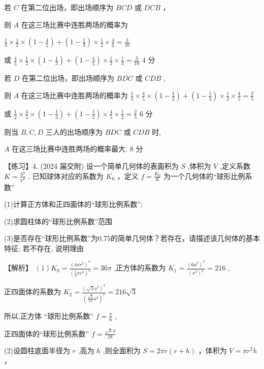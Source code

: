 \documentclass[10pt]{article}
\begin{document}
若 \(C\) 在第二位出场，即出场顺序为 \({BCD}\) 或 \({DCB}\) ，

则 \(A\) 在这三场比赛中连胜两场的概率为

\(\frac{1}{3} \times  \frac{1}{2} \times  \left( {1 - \frac{4}{5}}\right)  + \left( {1 - \frac{1}{3}}\right)  \times  \frac{1}{2} \times  \frac{4}{5} = \frac{3}{10}\)

或 \(\frac{4}{5} \times  \frac{1}{2} \times  \left( {1 - \frac{1}{3}}\right)  + \left( {1 - \frac{4}{5}}\right)  \times  \frac{1}{2} \times  \frac{1}{3} = \frac{3}{10}\) 4 分

若 \(D\) 在第二位出场，即出场顺序为 \({BDC}\) 或 \({CDB}\) ,

则 \(A\) 在这三场比赛中连胜两场的概率为 \(\frac{1}{3} \times  \frac{4}{5} \times  \left( {1 - \frac{1}{2}}\right)  + \left( {1 - \frac{1}{3}}\right)  \times  \frac{1}{2} \times  \frac{4}{5} = \frac{2}{5}\)

或 \(\frac{1}{2} \times  \frac{4}{5} \times  \left( {1 - \frac{1}{3}}\right)  + \left( {1 - \frac{1}{2}}\right)  \times  \frac{4}{5} \times  \frac{1}{2} = \frac{2}{5}\) 6 分

则当 \(B,C,D\) 三人的出场顺序为 \({BDC}\) 或 \({CDB}\) 时,

\(A\) 在这三场比赛中连胜两场的概率最大. 8 分

【练习】4. (2024 届交附) 设一个简单几何体的表面积为 \(S\) ,体积为 \(V\) ,定义系数 \(K = \frac{{S}^{3}}{{V}^{2}}\) . 已知球体对应的系数为 \({K}_{0}\) ，定义 \(f = \frac{{K}_{0}}{K}\) 为一个几何体的“球形比例系数”

(1)计算正方体和正四面体的“球形比例系数”;

(2)求圆柱体的“球形比例系数”范围

(3)是否存在“球形比例系数”为0.75的简单几何体？若存在，请描述该几何体的基本特征; 若不存在, 说明理由

【解析】 \(\left( 1\right) {K}_{0} = \frac{{\left( 4\pi {r}^{2}\right) }^{3}}{{\left( \frac{4}{3}\pi {r}^{3}\right) }^{2}} = {36\pi }\) ,正方体的系数为 \({K}_{1} = \frac{{\left( 6{a}^{2}\right) }^{3}}{{\left( {a}^{3}\right) }^{2}} = {216}\) ,

正四面体的系数为 \({K}_{2} = \frac{{\left( \sqrt{3}{a}^{2}\right) }^{3}}{{\left( \frac{\sqrt{2}}{12}{a}^{3}\right) }^{2}} = {216}\sqrt{3}\)

所以,正方体 “球形比例系数” \(f = \frac{\pi }{6}\) ,

正四面体的“球形比例系数” \(f = \frac{\sqrt{3}\pi }{18}\)

(2)设圆柱底面半径为 \(r\) ,高为 \(h\) ,则全面积为 \(S = {2\pi r}\left( {r + h}\right)\) ，体积为 \(V = \pi {r}^{2}h\) ，
\end{document}
